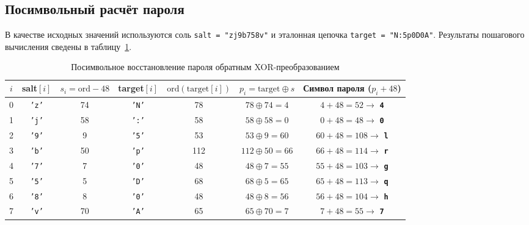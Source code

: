 \documentclass[a4paper]{article}
\begin{document}
\subsection{Посимвольный расчёт пароля}
В качестве исходных значений используются соль \texttt{salt = "zj9b758v"} и эталонная цепочка \texttt{target = "N:5p0D0A"}. Результаты пошагового вычисления сведены в таблицу~\ref{tab:passwd_calc}.

\begin{table}[h!]
  \caption{Посимвольное восстановление пароля обратным XOR-преобразованием}
  \label{tab:passwd_calc}
  \small
  \centering
  \begin{tabular}{|c|c|c|c|c|c|c|}
    \hline
    $i$ & salt$[i]$    & $s_i = \mathrm{ord} - 48$ & target$[i]$  & $\mathrm{ord}(\mathrm{target}[i])$ & $p_i = \mathrm{target} \oplus s$ & Символ пароля ($p_i+48$)                        \\
    \hline
    0   & \texttt{'z'} & 74                        & \texttt{'N'} & 78                                 & $78 \oplus 74 = 4$               & $4 + 48 = 52 \rightarrow$ \textbf{\texttt{4}}   \\
    1   & \texttt{'j'} & 58                        & \texttt{':'} & 58                                 & $58 \oplus 58 = 0$               & $0 + 48 = 48 \rightarrow$ \textbf{\texttt{0}}   \\
    2   & \texttt{'9'} & 9                         & \texttt{'5'} & 53                                 & $53 \oplus 9 = 60$               & $60 + 48 = 108 \rightarrow$ \textbf{\texttt{l}} \\
    3   & \texttt{'b'} & 50                        & \texttt{'p'} & 112                                & $112 \oplus 50 = 66$             & $66 + 48 = 114 \rightarrow$ \textbf{\texttt{r}} \\
    4   & \texttt{'7'} & 7                         & \texttt{'0'} & 48                                 & $48 \oplus 7 = 55$               & $55 + 48 = 103 \rightarrow$ \textbf{\texttt{g}} \\
    5   & \texttt{'5'} & 5                         & \texttt{'D'} & 68                                 & $68 \oplus 5 = 65$               & $65 + 48 = 113 \rightarrow$ \textbf{\texttt{q}} \\
    6   & \texttt{'8'} & 8                         & \texttt{'0'} & 48                                 & $48 \oplus 8 = 56$               & $56 + 48 = 104 \rightarrow$ \textbf{\texttt{h}} \\
    7   & \texttt{'v'} & 70                        & \texttt{'A'} & 65                                 & $65 \oplus 70 = 7$               & $7 + 48 = 55 \rightarrow$ \textbf{\texttt{7}}   \\
    \hline
  \end{tabular}
\end{table}
\end{document}
